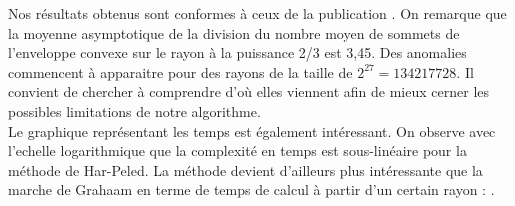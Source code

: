 Nos résultats obtenus sont conformes à ceux de la publication \cite{HarPeled98}. On remarque que la moyenne asymptotique de la division du nombre moyen de sommets de l'enveloppe convexe sur le rayon à la puissance 2/3 est 3,45. Des anomalies commencent à apparaitre pour des rayons de la taille de $2^{27} = 134217728$. Il convient de chercher à comprendre d'où elles viennent afin de mieux cerner les possibles limitations de notre algorithme.\\

Le graphique représentant les temps est également intéressant. On observe avec l'echelle logarithmique que la complexité en temps est sous-linéaire pour la méthode de Har-Peled. La méthode devient d'ailleurs plus intéressante que la marche de Grahaam en terme de temps de calcul à partir d'un certain rayon : .




